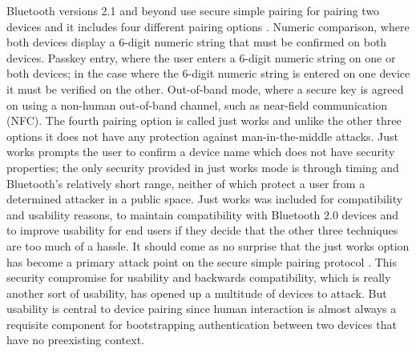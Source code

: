 \documentclass[12pt]{report}
\begin{document}
Bluetooth versions 2.1 and beyond use secure simple pairing for pairing two devices and it includes four different pairing options \cite{Bluetooth40Spec2010,SimplePairingAnalysisBluetooth4Phan2010,FormalAuthAnalysisBluetoothChang2007}. Numeric comparison, where both devices display a 6-digit numeric string that must be confirmed on both devices. Passkey entry, where the user enters a 6-digit numeric string on one or both devices; in the case where the 6-digit numeric string is entered on one device it must be verified on the other. Out-of-band mode, where a secure key is agreed on using a non-human out-of-band channel, such as near-field communication (NFC). The fourth pairing option is called just works and unlike the other three options it does not have any protection against man-in-the-middle attacks. Just works prompts the user to confirm a device name which does not have security properties; the only security provided in just works mode is through timing and Bluetooth's relatively short range, neither of which protect a user from a determined attacker in a public space. Just works was included for compatibility and usability reasons, to maintain compatibility with Bluetooth 2.0 devices and to improve usability for end users \cite{BluetoothInterfaceFlowSecureSimplePairing2007} if they decide that the other three techniques are too much of a hassle. It should come as no surprise that the just works option has become a primary attack point on the secure simple pairing protocol \cite{BluetoothSSPAttackJustWorksHaataja2008}. This security compromise for usability and backwards compatibility, which is really another sort of usability, has opened up a multitude of devices to attack. But usability is central to device pairing since human interaction is almost always a requisite component for bootstrapping authentication between two devices that have no preexisting context. \par
\end{document}
